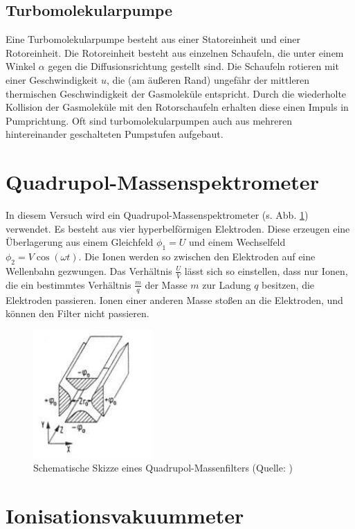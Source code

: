 \subsection{Turbomolekularpumpe}

Eine Turbomolekularpumpe besteht aus einer Statoreinheit und einer Rotoreinheit. Die Rotoreinheit besteht aus einzelnen Schaufeln, die unter einem Winkel $\alpha$ gegen die Diffusionsrichtung gestellt sind.
Die Schaufeln rotieren mit einer Geschwindigkeit $u$, die (am äußeren Rand) ungefähr der mittleren thermischen Geschwindigkeit der Gasmoleküle entspricht. Durch die wiederholte Kollision der Gasmoleküle mit den Rotorschaufeln erhalten diese einen Impuls in Pumprichtung.
Oft sind turbomolekularpumpen auch aus mehreren hintereinander geschalteten Pumpstufen aufgebaut.

\section{Quadrupol-Massenspektrometer}

In diesem Versuch wird ein Quadrupol-Massenspektrometer (s. Abb. \ref{fig021}) verwendet. Es besteht aus vier hyperbelförmigen Elektroden. Diese erzeugen eine Überlagerung aus einem Gleichfeld $\phi_{1}=U$ und einem Wechselfeld $\phi_{2}=V\cos(\omega t)$.
Die Ionen werden so zwischen den Elektroden auf eine Wellenbahn gezwungen. Das Verhältnis $\frac{U}{V}$ lässt sich so einstellen, dass nur Ionen, die ein bestimmtes Verhältnis $\frac{m}{q}$ der Masse $m$ zur Ladung $q$ besitzen, die Elektroden passieren. Ionen einer anderen Masse stoßen an die Elektroden, und können den Filter nicht passieren.

\begin{figure}[tb]
 \centering
 \includegraphics[scale=0.9]{./fig/massenspek_quadrupol.png}
 \caption{Schematische Skizze eines Quadrupol-Massenfilters (Quelle: \cite[S. 25]{Litmap})}
 \label{fig021}
\end{figure}

\section{Ionisationsvakuummeter}

